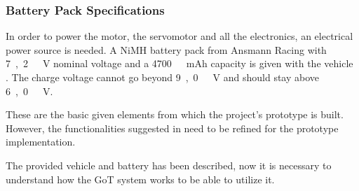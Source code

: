 \subsubsection{Battery Pack Specifications} \label{sssec:BatterySpecs}
In order to power the motor, the servomotor and all the electronics, an electrical power source is needed. A NiMH battery pack from Ansmann Racing with \si{7,2\ V} nominal voltage and a \si{4700\ mAh} capacity is given with the vehicle \cite{BatteryDS}. The charge voltage cannot go beyond \si{9,0\ V} and should stay above \si{6,0\ V}.

These are the basic given elements from which the project's prototype is built. However, the functionalities suggested in  need to be refined for the prototype implementation.

The provided vehicle and battery has been described, now it is necessary to understand how the GoT system works to be able to utilize it.